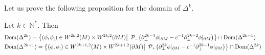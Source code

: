 Let us prove the following proposition for the domain of $\Delta^k$.
\begin{proposition}
Let $k \in \mathbb{N}^*$. Then
\begin{equation*}
\begin{split}
& \mathrm{Dom} (\Delta^{2k} )  =
\big\{ (\phi, \phi_|)\in W^{2k,2}(M)\times W^{2k,2}(\partial M) \big\vert \enskip \mathcal{P}_-\big( \partial_\bot^{2k-1}\phi\vert_{\partial M} - c^{-1}\partial_\bot^{2k-2}\phi\vert_{\partial M}\big) \big\} 
\cap \mathrm{Dom}(\Delta^{2k - 1})  \\
& \mathrm{Dom} (\Delta^{2k+1} )  =
\big\{ (\phi, \phi_|)\in W^{2k+1,2}(M)\times W^{2k+1,2}(\partial M) \big\vert \enskip \mathcal{P}_+\big( \partial_\bot^{2k}\phi\vert_{\partial M} - c^{-1}\partial_\bot^{2k-1}\phi\vert_{\partial M}\big) \big\}  \cap \mathrm{Dom}(\Delta^{2k })
\end{split}
\end{equation*}
\end{proposition}

